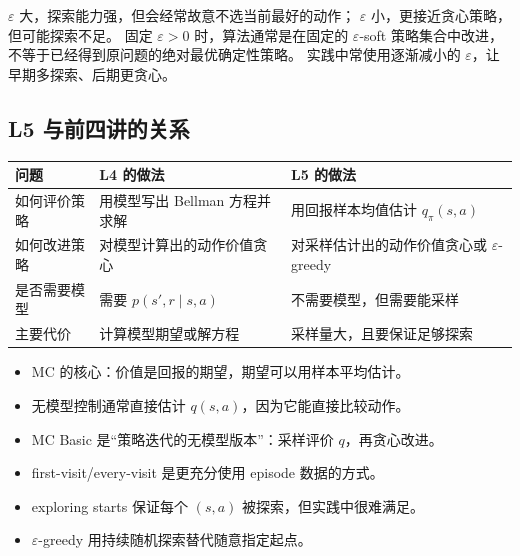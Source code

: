 \documentclass[11pt,a4paper,fontset=fandol]{ctexart}
\begin{document}
\begin{warningbox}[探索与最优性不能同时免费获得]
\(\varepsilon\) 大，探索能力强，但会经常故意不选当前最好的动作；
\(\varepsilon\) 小，更接近贪心策略，但可能探索不足。
固定 \(\varepsilon>0\) 时，算法通常是在固定的
\(\varepsilon\)-soft 策略集合中改进，不等于已经得到原问题的绝对最优确定性策略。
实践中常使用逐渐减小的 \(\varepsilon\)，让早期多探索、后期更贪心。
\end{warningbox}

\subsection{L5 与前四讲的关系}

\begin{center}
\begin{tabularx}{\textwidth}{
  >{\raggedright\arraybackslash}p{}
  >{\raggedright\arraybackslash}p{}
  X}
\toprule
问题 & L4 的做法 & L5 的做法\\
\midrule
如何评价策略 &
用模型写出 Bellman 方程并求解 &
用回报样本均值估计 \(q_\pi(s,a)\)\\
如何改进策略 &
对模型计算出的动作价值贪心 &
对采样估计出的动作价值贪心或 \(\varepsilon\)-greedy\\
是否需要模型 &
需要 \(p(s',r\mid s,a)\) &
不需要模型，但需要能采样\\
主要代价 &
计算模型期望或解方程 &
采样量大，且要保证足够探索\\
\bottomrule
\end{tabularx}
\end{center}

\begin{memorybox}
\begin{itemize}
  \item MC 的核心：价值是回报的期望，期望可以用样本平均估计。
  \item 无模型控制通常直接估计 \(q(s,a)\)，因为它能直接比较动作。
  \item MC Basic 是“策略迭代的无模型版本”：采样评价 \(q\)，再贪心改进。
  \item first-visit/every-visit 是更充分使用 episode 数据的方式。
  \item exploring starts 保证每个 \((s,a)\) 被探索，但实践中很难满足。
  \item \(\varepsilon\)-greedy 用持续随机探索替代随意指定起点。
\end{itemize}
\end{memorybox}

\clearpage
\end{document}
